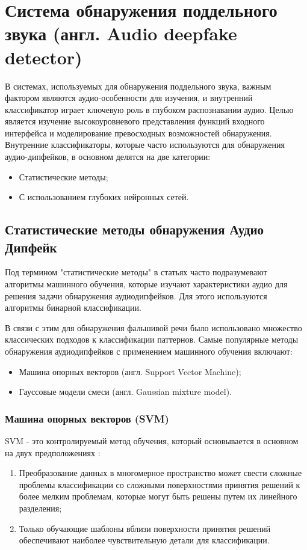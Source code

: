 \chapter{Система обнаружения поддельного звука (англ. Audio deepfake detector)}

В системах, используемых для обнаружения поддельного звука, важным фактором являются аудио-особенности для изучения, и внутренний классификатор играет ключевую роль в глубоком распознавании аудио. Целью является изучение высокоуровневого представления функций входного интерфейса и моделирование превосходных возможностей обнаружения. Внутренние классификаторы, которые часто используются для обнаружения аудио-дипфейков, в основном делятся на две категории:
\begin{itemize}
    \item Статистические методы;
    \item С использованием глубоких нейронных сетей.
\end{itemize}

\section{Статистические методы обнаружения Аудио Дипфейк}

Под термином "статистические методы" в статьях часто подразумевают алгоритмы машинного обучения, которые изучают характеристики аудио для решения задачи обнаружения аудиодипфейков. Для этого используются алгоритмы бинарной классификации.

В связи с этим для обнаружения фальшивой речи было использовано множество классических подходов к классификации паттернов. Самые популярные методы обнаружения аудиодипфейков с применением машинного обучения включают:

\begin{itemize}
    \item Машина опорных векторов (англ. Support Vector Machine);
    \item Гауссовые модели смеси (англ. Gaussian mixture model).
\end{itemize}

\subsection{Машина опорных векторов (SVM)}

SVM - это контролируемый метод обучения, который основывается в основном на двух предположениях \cite{hamza2022deepfake}:
\begin{enumerate}
    \item Преобразование данных в многомерное пространство может свести сложные проблемы классификации со сложными поверхностями принятия решений к более мелким проблемам, которые могут быть решены путем их линейного разделения;
    \item Только обучающие шаблоны вблизи поверхности принятия решений обеспечивают наиболее чувствительную детали для классификации.
\end{enumerate}

